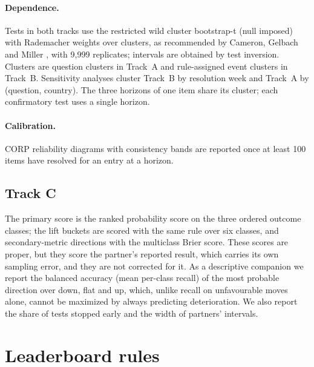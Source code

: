 \documentclass[11pt]{article}
\begin{document}
\paragraph{Dependence.}
\label{sec:dependence}
Tests in both tracks use the restricted wild cluster bootstrap-t (null imposed) with Rademacher weights over clusters, as recommended by Cameron, Gelbach and Miller \citep{cameron2008bootstrap}, with 9{,}999 replicates; intervals are obtained by test inversion. Clusters are question clusters in Track~A and rule-assigned event clusters in Track~B. Sensitivity analyses cluster Track~B by resolution week and Track~A by (question, country). The three horizons of one item share its cluster; each confirmatory test uses a single horizon.

\paragraph{Calibration.} CORP reliability diagrams with consistency bands \citep{dimitriadis2021stable} are reported once at least 100 items have resolved for an entry at a horizon.

\subsection{Track C}
The primary score is the ranked probability score \citep{epstein1969scoring} on the three ordered outcome classes; the lift buckets are scored with the same rule over six classes, and secondary-metric directions with the multiclass Brier score. These scores are proper, but they score the partner's reported result, which carries its own sampling error, and they are not corrected for it. As a descriptive companion we report the balanced accuracy (mean per-class recall) of the most probable direction over down, flat and up, which, unlike recall on unfavourable moves alone, cannot be maximized by always predicting deterioration. We also report the share of tests stopped early and the width of partners' intervals.

\section{Leaderboard rules}
\label{sec:rules}
\end{document}
